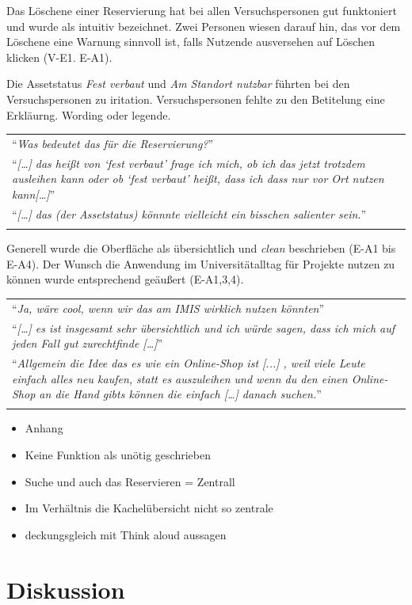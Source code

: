 Das Löschene einer Reservierung hat bei allen Versuchspersonen gut funktoniert
und wurde als intuitiv bezeichnet. Zwei Personen wiesen darauf hin, das vor dem
Löschene eine Warnung sinnvoll ist, falls Nutzende ausversehen auf Löschen
klicken (V-E1. E-A1).

Die Assetstatus \textit{Fest verbaut} und \textit{Am Standort nutzbar} führten
bei den Versuchspersonen zu iritation. Versuchspersonen fehlte zu den Betitelung
eine Erkläurng.  Wording oder legende.

\begin{longtable}{p{}} \arrayrulecolor{maincolor}\hline
  \enquote{\textit{Was bedeutet das für die Reservierung?}} \\
  \enquote{\textit{[\dots] das heißt von \enquote{fest verbaut} frage ich mich,
      ob ich das jetzt trotzdem ausleihen kann oder ob \enquote{fest verbaut} heißt,
  dass ich dass nur vor Ort nutzen kann[\dots]}}            \\
  \enquote{\textit{[\dots] das (der Assetstatus) könnnte vielleicht ein bisschen
  salienter sein.}}                                         \\
  \arrayrulecolor{maincolor}\hline
\end{longtable}

Generell wurde die Oberfläche als übersichtlich und \textit{clean} beschrieben
(E-A1 bis E-A4). Der Wunsch die Anwendung im Universitätalltag für Projekte
nutzen zu können wurde entsprechend geäußert (E-A1,3,4).

\begin{longtable}{p{}} \arrayrulecolor{maincolor}\hline
  \enquote{\textit{Ja, wäre cool, wenn wir das am IMIS wirklich nutzen
  könnten}}                                                      \\
  \enquote{\textit{[\dots] es ist insgesamt sehr übersichtlich und ich würde
  sagen, dass ich mich auf jeden Fall gut zurechtfinde [\dots]}} \\
  \enquote{\textit{Allgemein die Idee das es wie ein Online-Shop ist [...] ,
      weil viele Leute einfach alles neu kaufen, statt es auszuleihen und wenn du
      den einen Online-Shop an die Hand gibts können die einfach [\dots] danach
  suchen.}}                                                      \\
  \arrayrulecolor{maincolor}\hline
\end{longtable}


\begin{itemize}
  \item Anhang
  \item Keine Funktion als unötig geschrieben
  \item Suche und auch das Reservieren = Zentrall
  \item Im Verhältnis die Kachelübersicht nicht so zentrale
  \item deckungsgleich mit Think aloud aussagen
\end{itemize}


\section{Diskussion}